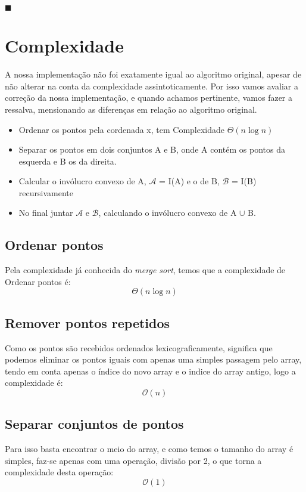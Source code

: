 \documentclass[11pt]{article}
\begin{document}
\hfill $\blacksquare$


\section{Complexidade}
A nossa implementação não foi exatamente igual ao algoritmo original,
apesar de não alterar na conta da complexidade assintoticamente.
Por isso vamos avaliar a correção da nossa implementação, e quando 
achamos pertinente, vamos fazer a ressalva, mensionando as diferenças 
em relação ao algoritmo original.

\begin{itemize}
    \item Ordenar os pontos pela cordenada x, tem Complexidade $\Theta(n\log{}n)$
    \item Separar os pontos em dois conjuntos A e B, onde A contém os pontos da esquerda e B os da direita.
    \item Calcular o invólucro convexo de A, $\mathcal{A}$ = I(A) e o de B, $\mathcal{B}$ = I(B) recursivamente
    \item No final juntar $\mathcal{A}$ e $\mathcal{B}$, calculando o invólucro convexo de A $\cup$ B.
\end{itemize}

\subsection{Ordenar pontos}
Pela complexidade já conhecida do \textit{merge sort}, 
temos que a complexidade de Ordenar pontos é:
$$\Theta(n\log{}n)$$

\subsection{Remover pontos repetidos}
Como os pontos são recebidos ordenados lexicograficamente,
significa que podemos eliminar os pontos iguais com apenas
uma simples passagem pelo array, tendo em conta apenas o 
índice do novo array e o indice do array antigo, logo a 
complexidade é:
$$\mathcal{O}(n)$$

\subsection{Separar conjuntos de pontos}
Para isso basta encontrar o meio do array,
e como temos o tamanho do array é simples, faz-se apenas com uma operação,
divisão por 2, o que torna a complexidade desta operação:
$$\mathcal{O}(1)$$
\end{document}
